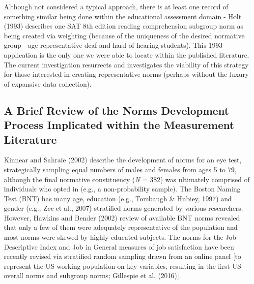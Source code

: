\documentclass[
  ,man]{apa7}
\begin{document}
Although not considered a typical approach, there is at least one record of something similar being done within the educational assessment domain - Holt (1993) describes one SAT 8th edition reading comprehension subgroup norm as being created via weighting (because of the uniqueness of the desired normative group - age representative deaf and hard of hearing students). This 1993 application is the only one we were able to locate within the published literature. The current investigation resurrects and investigates the viability of this strategy for those interested in creating representative norms (perhaps without the luxury of expansive data collection).

\hypertarget{a-brief-review-of-the-norms-development-process-implicated-within-the-measurement-literature}{%
\subsection{A Brief Review of the Norms Development Process Implicated within the Measurement Literature}\label{a-brief-review-of-the-norms-development-process-implicated-within-the-measurement-literature}}

Kinnear and Sahraie (2002) describe the development of norms for an eye test, strategically sampling equal numbers of males and females from ages 5 to 79, although the final normative constituency (\emph{N} = 382) was ultimately comprised of individuals who opted in (e.g., a non-probability sample). The Boston Naming Test (BNT) has many age, education (e.g., Tombaugh \& Hubiey, 1997) and gender (e.g., Zec et al., 2007) stratified norms generated by various researchers. However, Hawkins and Bender (2002) review of available BNT norms revealed that only a few of them were adequately representative of the population and most norms were skewed by highly educated subjects. The norms for the Job Descriptive Index and Job in General measures of job satisfaction have been recently revised via stratified random sampling drawn from an online panel {[}to represent the US working population on key variables, resulting in the first US overall norms and subgroup norms; Gillespie et al. (2016){]}.
\end{document}
